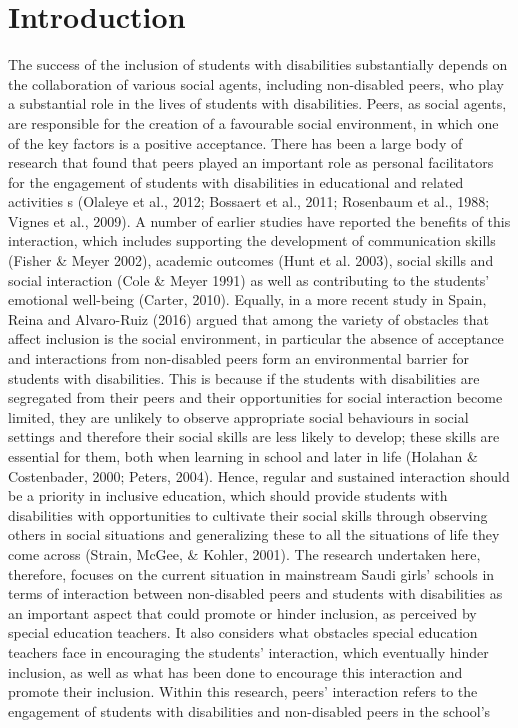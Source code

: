 \documentclass[11pt]{sig-alternate}
\begin{document}
\vspace{5mm}
\section*{\vspace{140mm}}
\section*{Introduction}
\begin{large}

The success of the inclusion of students with disabilities substantially depends on the collaboration of various social agents, including non-disabled peers, who play a substantial role in the lives of students with disabilities. Peers, as social agents, are responsible for the creation of a favourable social environment, in which one of the key factors is a positive acceptance. There has been a large body of research that found that peers played an important role as personal facilitators for the engagement of students with disabilities in educational and related activities s (Olaleye et al., 2012; Bossaert et al., 2011; Rosenbaum et al., 1988; Vignes et al., 2009). A number of earlier studies have reported the benefits of this interaction, which includes supporting the development of communication skills (Fisher \& Meyer 2002), academic outcomes (Hunt et al. 2003), social skills and social interaction (Cole \& Meyer 1991) as well as contributing to the students’ emotional well-being (Carter, 2010). Equally, in a more recent study in Spain, Reina and Alvaro-Ruiz (2016) argued that among the variety of obstacles that affect inclusion is the social environment, in particular the absence of acceptance and interactions from non-disabled peers form an environmental barrier for students with disabilities. This is because if the students with disabilities are segregated from their peers and their opportunities for social interaction become limited, they are unlikely to observe appropriate social behaviours in social settings and therefore their social skills are less likely to develop; these skills are essential for them, both when learning in school and later in life (Holahan \& Costenbader, 2000; Peters, 2004). Hence, regular and sustained interaction should be a priority in inclusive education, which should provide students with disabilities with opportunities to cultivate their social skills through observing others in social situations and generalizing these to all the situations of life they come across (Strain, McGee, \& Kohler, 2001). The research undertaken here, therefore, focuses on the current situation in mainstream Saudi girls’ schools in terms of interaction between non-disabled peers and students with disabilities as an important aspect that could promote or hinder inclusion, as perceived by special education teachers. It also considers what obstacles special education teachers face in encouraging the students’ interaction, which eventually hinder inclusion, as well as what has been done to encourage this interaction and promote their inclusion. Within this research, peers’ interaction refers to the engagement of students with disabilities and non-disabled peers in the school’s 
\end{large}
\end{document}

